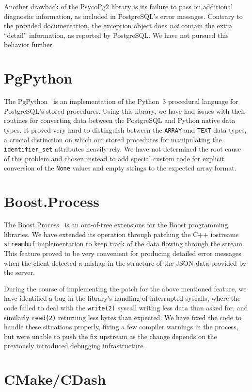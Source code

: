 \documentclass[deska]{subfiles}
\begin{document}
Another drawback of the PsycoPg2 library is its failure to pass on additional diagnostic information, as included in
PostgreSQL's error messages.  Contrary to the provided documentation, the exception object does {\em not} contain the
extra ``detail'' information, as reported by PostgreSQL.  We have not pursued this behavior further.

\section{PgPython}

The PgPython~\cite{pgpython} is an implementation of the Python~3 procedural language for PostgreSQL's stored
procedures.  Using this library, we have had issues with their routines for converting data between the PostgreSQL and
Python native data types.  It proved very hard to distinguish between the {\tt ARRAY} and {\tt TEXT} data types, a
crucial distinction on which our stored procedures for manipulating the {\tt identifier\_set} attributes heavily rely.
We have not determined the root cause of this problem and chosen instead to add special custom code for explicit
conversion of the {\tt None} values and empty strings to the expected array format.

\section{Boost.Process}

The Boost.Process~\cite{boost-process} is an out-of-tree extensions for the Boost programming libraries.  We have
extended its operation through patching the C++ iostreams {\tt streambuf} implementation to keep track of the data
flowing through the stream.  This feature proved to be very convenient for producing detailed error messages when the
client detected a mishap in the structure of the JSON data provided by the server.

During the course of implementing the patch for the above mentioned feature, we have identified a bug in the library's
handling of interrupted syscalls, where the code failed to deal with the {\tt write(2)} syscall writing less data than
asked for, and similarly {\tt read(2)} returning less bytes than expected.  We have fixed the code to handle these
situations properly, fixing a few compiler warnings in the process, but were unable to push the fix upstream as the
change depends on the previously introduced debugging infrastructure.

\section{CMake/CDash}
\end{document}
